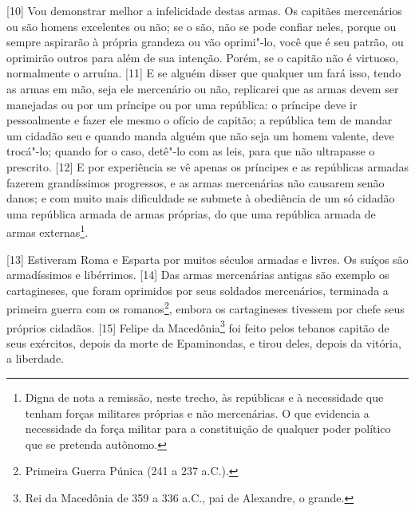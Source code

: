 {[}10{]} Vou demonstrar melhor a infelicidade destas armas. Os capitães
mercenários ou são homens excelentes ou não; se o são, não se pode
confiar neles, porque ou sempre aspirarão à própria grandeza ou vão
oprimi"-lo, você que é seu patrão, ou oprimirão outros para além de sua
intenção. Porém, se o capitão não é virtuoso, normalmente o arruína.
{[}11{]} E se alguém disser que qualquer um fará isso, tendo as armas em
mão, seja ele mercenário ou não, replicarei que as armas devem ser
manejadas ou por um príncipe ou por uma república: o príncipe deve ir
pessoalmente e fazer ele mesmo o ofício de capitão; a república tem de
mandar um cidadão seu e quando manda alguém que não seja um homem
valente, deve trocá"-lo; quando for o caso, detê"-lo com as leis, para que
não ultrapasse o prescrito. {[}12{]} E por experiência se vê apenas os
príncipes e as repúblicas armadas fazerem grandíssimos progressos, e as
armas mercenárias não causarem senão danos; e com muito mais dificuldade
se submete à obediência de um só cidadão uma república armada de armas
próprias, do que uma república armada de armas externas\footnote{Digna
  de nota a remissão, neste trecho, às repúblicas e à necessidade que
  tenham forças militares próprias e não mercenárias. O que evidencia a
  necessidade da força militar para a constituição de qualquer poder
  político que se pretenda autônomo.}.

{[}13{]} Estiveram Roma e Esparta por muitos séculos armadas e livres.
Os suíços são armadíssimos e libérrimos. {[}14{]} Das armas mercenárias
antigas são exemplo os cartagineses, que foram oprimidos por seus
soldados mercenários, terminada a primeira guerra com os
romanos\footnote{Primeira Guerra Púnica (241 a 237 a.C.).}, embora os
cartagineses tivessem por chefe seus próprios cidadãos. {[}15{]} Felipe
da Macedônia\footnote{Rei da Macedônia de 359 a 336 a.C., pai de
  Alexandre, o grande.} foi feito pelos tebanos capitão de seus
exércitos, depois da morte de Epaminondas, e tirou deles, depois da
vitória, a liberdade.

